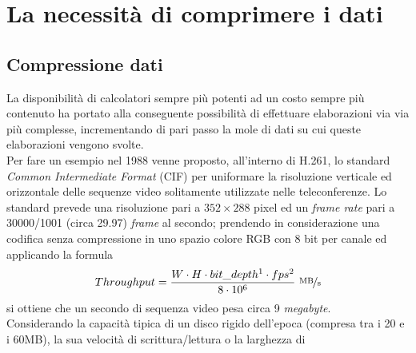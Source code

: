 
\chapter{La necessità di comprimere i dati} %

\label{Chapter3}



\section{Compressione dati}
La disponibilità di calcolatori sempre più potenti ad un costo sempre più
contenuto ha portato alla conseguente possibilità di effettuare elaborazioni
via via più complesse, incrementando di pari passo la mole di dati su cui
queste elaborazioni vengono svolte. \\
Per fare un esempio nel 1988 venne proposto, all'interno di H.261, lo standard
\emph{Common Intermediate Format} (CIF) per uniformare la risoluzione verticale
ed orizzontale delle sequenze video solitamente utilizzate nelle teleconferenze.
Lo standard prevede una risoluzione pari a $352{\times}288$ pixel ed un
\emph{frame rate} pari a 30000/1001 (circa 29.97) \emph{frame} al secondo;
prendendo in considerazione una codifica senza compressione in uno spazio
colore RGB con 8 bit per canale ed applicando la formula
\begin{align*}
  \displaystyle Throughput = \frac{
  W \cdot H \cdot bit\_depth\footnotemark[1] \cdot 
  fps\footnotemark[2]}{8\cdot10^6} 
  \ \nicefrac{\text{MB}}{\text{s}}
\end{align*}%
si ottiene che un secondo di sequenza video pesa circa 9 \emph{megabyte}. \\
Considerando la capacità tipica di un disco rigido dell'epoca (compresa
tra i 20 e i 60MB), la sua velocità di scrittura/lettura o la larghezza di 
